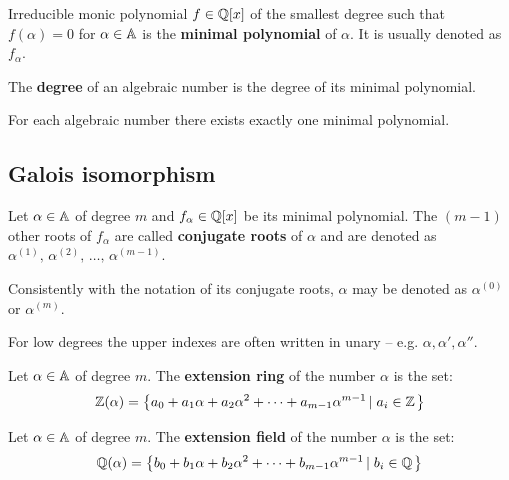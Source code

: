 \documentclass[text.tex]{subfiles}
\begin{document}
\begin{definition}
Irreducible monic polynomial $f\in\mathbb{Q}[x]$ of the smallest degree such that $f(\alpha) = 0$ for $\alpha\in\mathbb{A}$ is the \textbf{minimal polynomial} of $\alpha$. It is usually denoted as $f_\alpha$.
\end{definition}

\begin{definition}
The \textbf{degree} of an algebraic number is the degree of its minimal polynomial. 
\end{definition}

\begin{remark}
For each algebraic number there exists exactly one minimal polynomial. 
\end{remark}

\subsection{Galois isomorphism}

\begin{definition}
Let $\alpha\in\mathbb{A}$ of degree $m$ and $f_\alpha\in\mathbb{Q}[x]$ be its minimal polynomial. The $(m-1)$ other roots of $f_\alpha$ are called \textbf{conjugate roots} of $\alpha$ and are denoted as $\alpha^{(1)},\,\alpha^{(2)},\,\dots,\,\alpha^{(m-1)}$. 
\end{definition}

\begin{remark}
Consistently with the notation of its conjugate roots, $\alpha$ may be denoted as $\alpha^{(0)}$ or $\alpha^{(m)}$.
\end{remark}

\begin{remark}
For low degrees the upper indexes are often written in unary -- e.g. $\alpha, \alpha', \alpha''$. 
\end{remark}

\begin{definition}
Let $\alpha\in\mathbb{A}$ of degree $m$. The \textbf{extension ring} of the number $\alpha$ is the set: 
$$\mathbb{Z}(\alpha) = \left\{ a_0 + a_1\alpha + a_2\alpha^2 + \dots + a_{m-1}\alpha^{m-1} \left |\; a_i\in\mathbb{Z}\right. \right\}$$
\end{definition}

\begin{definition}
Let $\alpha\in\mathbb{A}$ of degree $m$. The \textbf{extension field} of the number $\alpha$ is the set: 
$$\mathbb{Q}(\alpha) = \left\{ b_0 + b_1\alpha + b_2\alpha^2 + \dots + b_{m-1}\alpha^{m-1} \left |\; b_i\in\mathbb{Q}\right. \right\}$$
\end{definition}
\end{document}
